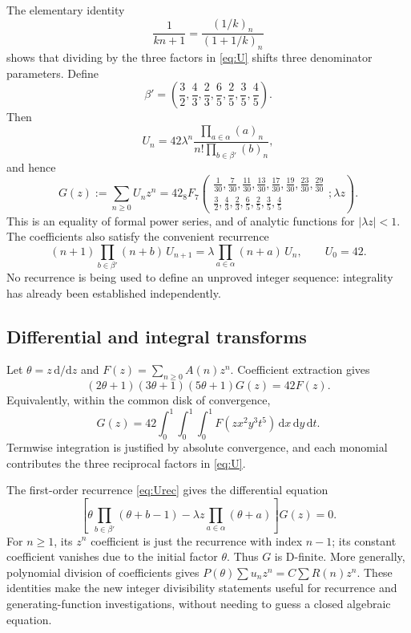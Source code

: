 \documentclass[11pt]{article}
\theoremstyle{definition}
\theoremstyle{remark}
\newcommand{\dd}{\,\mathrm d}
\newcommand{\hyp}[3]{{}_{8}F_{7}\!\left(\begin{matrix}#1\\#2\end{matrix};#3\right)}
\begin{document}
The elementary identity
\[
 \frac{1}{kn+1}=\frac{(1/k)_n}{(1+1/k)_n}
\]
shows that dividing by the three factors in \eqref{eq:U} shifts three
denominator parameters. Define
\[
 \beta'=\left(\frac32,\frac43,\frac23,
                      \frac65,\frac25,\frac35,\frac45\right).
\]
Then
\begin{equation}\label{eq:Upock}
 U_n=42\lambda^n\frac{\prod_{a\in\alpha}(a)_n}
                           {n!\prod_{b\in\beta'}(b)_n},
\end{equation}
and hence
\begin{equation}\label{eq:Uhypergeom}
 G(z):=\sum_{n\geq0}U_nz^n
 =42\hyp{\frac1{30},\frac7{30},\frac{11}{30},\frac{13}{30},
             \frac{17}{30},\frac{19}{30},\frac{23}{30},\frac{29}{30}}
 {\frac32,\frac43,\frac23,\frac65,\frac25,\frac35,\frac45}{\lambda z}.
\end{equation}
This is an equality of formal power series, and of analytic functions
for $|\lambda z|<1$. The coefficients also satisfy the convenient
recurrence
\begin{equation}\label{eq:Urec}
 (n+1)\prod_{b\in\beta'}(n+b)\,U_{n+1}
 =\lambda\prod_{a\in\alpha}(n+a)\,U_n,\qquad U_0=42.
\end{equation}
No recurrence is being used to define an unproved integer sequence:
integrality has already been established independently.

\subsection{Differential and integral transforms}
Let $\theta=z\,\mathrm d/\mathrm dz$ and
$F(z)=\sum_{n\geq0}A(n)z^n$. Coefficient extraction gives
\begin{equation}\label{eq:Euleroperator}
 (2\theta+1)(3\theta+1)(5\theta+1)G(z)=42F(z).
\end{equation}
Equivalently, within the common disk of convergence,
\begin{equation}\label{eq:integral}
 G(z)=42\int_0^1\!\int_0^1\!\int_0^1
       F(zx^2y^3t^5)\dd x\dd y\dd t.
\end{equation}
Termwise integration is justified by absolute convergence, and each
monomial contributes the three reciprocal factors in \eqref{eq:U}.

The first-order recurrence \eqref{eq:Urec} gives the differential equation
\begin{equation}\label{eq:hypode}
 \left[\theta\prod_{b\in\beta'}(\theta+b-1)
       -\lambda z\prod_{a\in\alpha}(\theta+a)\right]G(z)=0.
\end{equation}
For $n\geq1$, its $z^n$ coefficient is just the recurrence with index
$n-1$; its constant coefficient vanishes due to the initial factor
$\theta$. Thus $G$ is D-finite. More generally, polynomial division
of coefficients gives $P(\theta)\sum u_nz^n=C\sum R(n)z^n$.
These identities make the new integer divisibility statements useful
for recurrence and generating-function investigations, without needing
to guess a closed algebraic equation.
\end{document}
